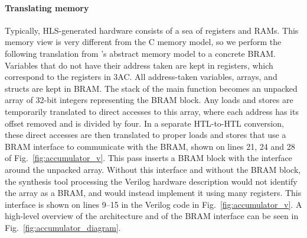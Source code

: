 \begin{figure*}
  \caption{The FSMD for the example shown in Fig.~\ref{fig:accumulator_c_rtl}, split into a data-path and control logic for the next state calculation.  The Update block takes the current state, current values of all registers and at most one value stored in the \gls{BRAM}, and calculates a new value that can either be stored back in the \gls{BRAM} or in a register.}\label{fig:accumulator_diagram}
\end{figure*}

\paragraph{Translating memory}
Typically, HLS-generated hardware consists of a sea of registers and RAMs.
This memory view is very different from the C memory model, so we perform the following translation from \compcert{}'s abstract memory model to a concrete \gls{BRAM}.\@
Variables that do not have their address taken are kept in registers, which correspond to the registers in 3AC.
All address-taken variables, arrays, and structs are kept in \gls{BRAM}.
The stack of the main function becomes an unpacked array of 32-bit integers representing the \gls{BRAM} block.  Any loads and stores are temporarily translated to direct accesses to this array, where each address has its offset removed and is divided by four.  In a separate HTL-to-HTL conversion, these direct accesses are then translated to proper loads and stores that use a \gls{BRAM} interface to communicate with the \gls{BRAM}, shown on lines 21, 24 and 28 of Fig.~\ref{fig:accumulator_v}.  This pass inserts a \gls{BRAM} block with the interface around the unpacked array.  Without this interface and without the \gls{BRAM} block, the synthesis tool processing the Verilog hardware description would not identify the array as a \gls{BRAM}, and would instead implement it using many registers.  This interface is shown on lines 9--15 in the Verilog code in Fig.~\ref{fig:accumulator_v}.
A high-level overview of the architecture and of the \gls{BRAM} interface can be seen in Fig.~\ref{fig:accumulator_diagram}.

